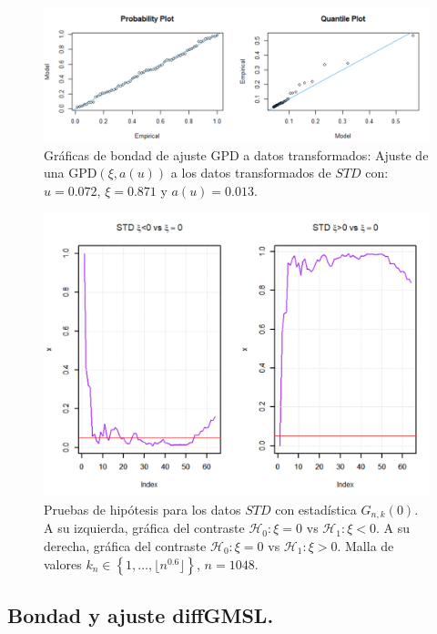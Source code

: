 \documentclass[10.5pt,notitlepage]{article}
\newcommand{\kis}[1]{\left\{ #1 \right\}}
\newcommand{\floor}[1]{\lfloor #1 \rfloor}
\theoremstyle{plain}
\begin{document}
\begin{figure}[htb]
    \centering
    \includegraphics[scale = 0.4]{Incisob/AP2trans.png}
    \caption{Gráficas de bondad de ajuste GPD a datos transformados: Ajuste de una GPD\((\xi,a(u))\) a los datos transformados de \(STD\) con: \(u = 0.072\), \(\xi = 0.871\) y \(a(u) = 0.013\).}
    \label{fig:14}   
\end{figure}

\begin{figure}[htb]
    \centering
    \includegraphics[scale = 0.4]{Incisob/PH1.png}
    \caption{Pruebas de hipótesis para los datos \(STD\) con estadística \(G_{n,k}(0)\). A su izquierda, gráfica del contraste \(\mathcal{H}_0: \xi = 0\) vs \(\mathcal{H}_1: \xi < 0\). A su derecha, gráfica del contraste \(\mathcal{H}_0: \xi = 0\) vs \(\mathcal{H}_1: \xi > 0\). Malla de valores \(k_{n}\in\kis{1, \hdots, \floor{n^{0.6}}}\), \(n = 1048\).}
    \label{fig:15}
\end{figure}
\subsection{Bondad y ajuste diffGMSL.}
\end{document}
